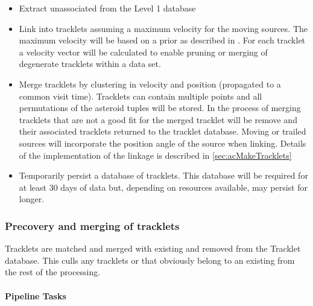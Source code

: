 \begin{itemize}
\item Extract unassociated \DIASources from the Level 1 database
\item Link \DIASources into tracklets assuming a maximum velocity for the moving sources. The maximum velocity will be based on a prior as described in  \cite{2007ASPC..376..395K}. For each tracklet a velocity vector will be calculated to enable pruning or merging of degenerate tracklets within a data set.
\item Merge tracklets by clustering in velocity and position (propagated to a common visit time). Tracklets can contain multiple points and all permutations of the asteroid tuples will be stored. In the process of merging tracklets \DIASources that are not a good fit for the merged tracklet will be remove and their associated tracklets returned to the tracklet database.  Moving or trailed sources will incorporate the position angle of the source when linking. Details of the implementation of the \DIASource linkage is described in \ref{sec:acMakeTracklets}
\item Temporarily persist a database of tracklets. This database will be required for at least 30 days of data but, depending on resources available, may persist for longer.
\end{itemize}


\subsubsection{Precovery and merging of tracklets}

Tracklets are matched and merged with existing \SSObjects and removed from the Tracklet database. This culls any tracklets or \DIASources that obviously belong to an existing \SSObject from the rest of the processing.

\paragraph{Pipeline Tasks}

